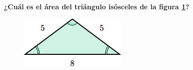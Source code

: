 \begin{multicols}{2}
    \textbf{¿Cuál es el \'area del triángulo isósceles de la figura \ref{fig:area_isoseles_03}?}

    \begin{figure}[H]
        \centering
        \includegraphics[width=0.5\linewidth]{../images/area_isoseles_03.png}
        \caption{}
        \label{fig:area_isoseles_03}
    \end{figure}
\end{multicols}\vspace{-0.5cm}
